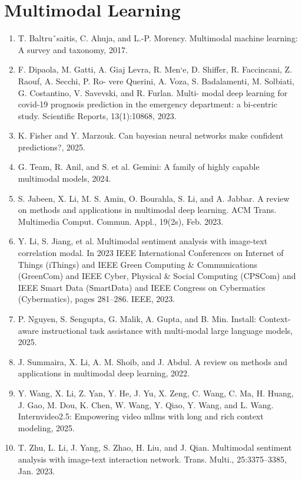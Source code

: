 \documentclass[]{article}
\begin{document}
\section{Multimodal Learning}
\begin{enumerate}
\item T. Baltruˇsaitis, C. Ahuja, and L.-P. Morency. Multimodal machine learning: A survey and taxonomy,
2017.
\item F. Dipaola, M. Gatti, A. Giaj Levra, R. Men`e, D. Shiffer, R. Faccincani, Z. Raouf, A. Secchi, P. Ro-
vere Querini, A. Voza, S. Badalamenti, M. Solbiati, G. Costantino, V. Savevski, and R. Furlan. Multi-
modal deep learning for covid-19 prognosis prediction in the emergency department: a bi-centric study.
Scientific Reports, 13(1):10868, 2023.
\item K. Fisher and Y. Marzouk. Can bayesian neural networks make confident predictions?, 2025.
\item G. Team, R. Anil, and S. et al. Gemini: A family of highly capable multimodal models, 2024.
\item S. Jabeen, X. Li, M. S. Amin, O. Bourahla, S. Li, and A. Jabbar. A review on methods and applications
in multimodal deep learning. ACM Trans. Multimedia Comput. Commun. Appl., 19(2s), Feb. 2023.
\item Y. Li, S. Jiang, et al. Multimodal sentiment analysis with image-text correlation modal. In 2023 IEEE
International Conferences on Internet of Things (iThings) and IEEE Green Computing \& Communications (GreenCom) and IEEE Cyber, Physical \& Social Computing (CPSCom) and IEEE Smart Data
(SmartData) and IEEE Congress on Cybermatics (Cybermatics), pages 281–286. IEEE, 2023.
\item  P. Nguyen, S. Sengupta, G. Malik, A. Gupta, and B. Min. Install: Context-aware instructional task
assistance with multi-modal large language models, 2025.
\item J. Summaira, X. Li, A. M. Shoib, and J. Abdul. A review on methods and applications in multimodal
deep learning, 2022.
\item Y. Wang, X. Li, Z. Yan, Y. He, J. Yu, X. Zeng, C. Wang, C. Ma, H. Huang, J. Gao, M. Dou, K. Chen,
W. Wang, Y. Qiao, Y. Wang, and L. Wang. Internvideo2.5: Empowering video mllms with long and rich
context modeling, 2025.
\item T. Zhu, L. Li, J. Yang, S. Zhao, H. Liu, and J. Qian. Multimodal sentiment analysis with image-text
interaction network. Trans. Multi., 25:3375–3385, Jan. 2023.
\end{enumerate}
\end{document}
